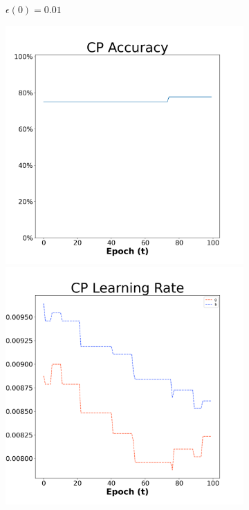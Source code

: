 \begin{figure}[H]
\begin{subfigure}{0.3\textwidth}
  \caption{$\epsilon(0)=0.01$}
\end{subfigure}\hfil %
\begin{subfigure}{0.3\textwidth}
  \includegraphics[width=\linewidth]{images/exper1/Ionosphere/CP_0.03_acc.png}
  \includegraphics[width=\linewidth]{images/exper1/Ionosphere/CP_0.03_lr.png}

\end{subfigure}
\end{figure}

